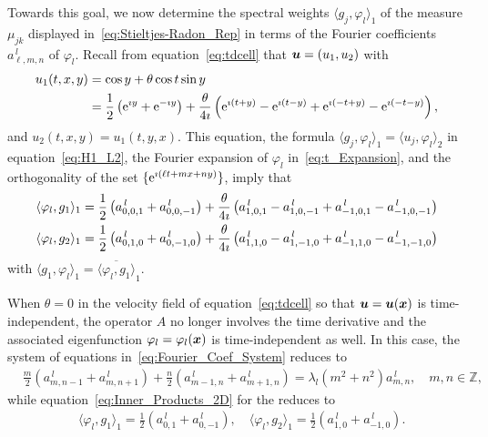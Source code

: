 \documentclass[amsa]{ipart}
\begin{document}
Towards this goal, we now determine the spectral weights $\langle
g_j,\varphi_l\rangle_1$ of the measure $\mu_{jk}$ displayed
in~\eqref{eq:Stieltjes-Radon_Rep} in terms of the Fourier coefficients
$a^{\,l}_{\ell,m,n}$ of $\varphi_l$. Recall from equation~\eqref{eq:tdcell}
that $\boldsymbol{u}=(u_1,u_2)$ with
%
\begin{align}
  u_1(t,x,y)&=\cos{y}+\theta\cos{t}\sin{y}\\ 
           &=\frac{1}{2}\left(\e^{\imath y}+\e^{-\imath y}\right)
            +\frac{\theta}{4\imath}\left(\e^{\imath(t+y)}-\e^{\imath(t-y)}+\e^{\imath(-t+y)}-\e^{\imath(-t-y)}\right),
            \notag
\end{align}
%
and $u_2(t,x,y)=u_1(t,y,x)$. This equation, the formula $\langle
g_j,\varphi_l\rangle_1=\langle u_j,\varphi_l\rangle_2$ in equation~\eqref{eq:H1_L2}, the Fourier 
expansion of $\varphi_l$ in~\eqref{eq:t_Expansion}, and the orthogonality of
the set $\{\mathrm{e}^{\imath(\ell t+mx+ny)}\}$, imply that
%
\begin{align}\label{eq:Inner_Products_2D}
  \langle\varphi_l,g_1\rangle_1=\frac{1}{2}\left(a^{\,l}_{0,0,1}+a^{\,l}_{0,0,-1}\right)
               +\frac{\theta}{4\imath}\left(a^{\,l}_{1,0,1}-a^{\,l}_{1,0,-1}+a^{\,l}_{-1,0,1}-a^{\,l}_{-1,0,-1}\right) 
               \\
  \langle\varphi_l,g_2\rangle_1=\frac{1}{2}\left(a^{\,l}_{0,1,0}+a^{\,l}_{0,-1,0}\right)
               +\frac{\theta}{4\imath}\left(a^{\,l}_{1,1,0}-a^{\,l}_{1,-1,0}+a^{\,l}_{-1,1,0}-a^{\,l}_{-1,-1,0}\right)
               \notag
\end{align}
%
with $\langle g_1,\varphi_l\rangle_1=\overline{\langle\varphi_l,g_1\rangle}_1$.



When $\theta=0$ in the velocity field of equation~\eqref{eq:tdcell} so that
$\boldsymbol{u}=\boldsymbol{u}(\boldsymbol{x})$ is time-independent, the
operator $A$ no longer involves the time derivative and the associated
eigenfunction $\varphi_l=\varphi_l(\boldsymbol{x})$ is time-independent as well. In this case, the 
system of equations in~\eqref{eq:Fourier_Coef_System} reduces to
%
\begin{align}\label{eq:Fourier_Coef_System_Steady}
  &\frac{m}{2}(a^{\,l}_{m,n-1}+a^{\,l}_{m,n+1})+\frac{n}{2}(a^{\,l}_{m-1,n}+a^{\,l}_{m+1,n})=\lambda_l(m^2+n^2)a^{\,l}_{m,n},
  \quad m,n\in\mathbb{Z},  
\end{align}
%
while equation~\eqref{eq:Inner_Products_2D} for the reduces to
%
\begin{align}\label{eq:Inner_Products_2D_Steady}
  &\langle\varphi_l,g_1\rangle_1=\frac{1}{2}\left(a^{\,l}_{0,1}+a^{\,l}_{0,-1}\right),
  \quad
  \langle\varphi_l,g_2\rangle_1=\frac{1}{2}\left(a^{\,l}_{1,0}+a^{\,l}_{-1,0}\right).
\end{align}
%
\end{document}
